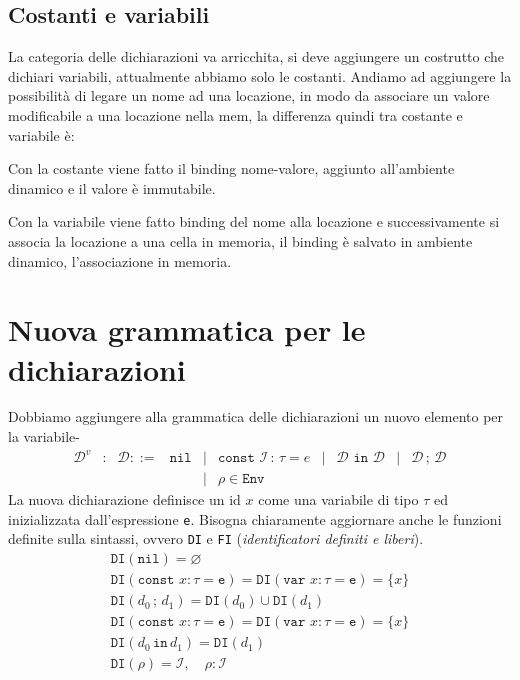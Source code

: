 \documentclass[oneside,a4paper,11pt]{book}
\theoremstyle{italicstyle}
\theoremstyle{normStyle}
\begin{document}
\subsection{Costanti e variabili}
La categoria delle dichiarazioni va arricchita, si deve aggiungere un
costrutto che dichiari variabili, attualmente abbiamo solo le costanti.
Andiamo ad aggiungere la possibilità di legare un nome ad una locazione,
in modo da associare un valore modificabile a una locazione nella mem, la
differenza quindi tra costante e variabile è:
\begin{tcolorbox}[title = {Costanti}]
  Con la costante viene fatto il binding nome-valore, aggiunto all’ambiente
  dinamico e il valore è immutabile.
\end{tcolorbox}
\begin{tcolorbox}[title = {Variabili}]
  Con la variabile viene fatto binding del nome alla locazione e
  successivamente si associa la locazione a una cella in memoria,
  il binding è salvato in ambiente dinamico, l’associazione in memoria.
\end{tcolorbox}
\section{Nuova grammatica per le dichiarazioni}
Dobbiamo aggiungere alla grammatica delle dichiarazioni un nuovo elemento per la variabile-
\[
  \begin{matrix}
    \mathcal{D}^v & : & \mathcal{D} ::=&\texttt{nil} & | & \texttt{const }\mathcal{I}\,:\,\tau = e&
    | & \mathcal{D} \texttt{ in } \mathcal{D} & | & \mathcal{D}\,;\,\mathcal{D}\\
    &&&& | & \rho \in \texttt{Env}
  \end{matrix}
\]
La nuova dichiarazione definisce un id $x$ come una variabile di tipo $\tau$ ed
inizializzata dall'espressione \verb|e|. Bisogna chiaramente aggiornare anche le
funzioni definite sulla sintassi, ovvero \verb|DI| e \verb|FI| (\textit{identificatori definiti
e liberi}).
\begin{align*}
  \texttt{DI}(\texttt{nil}) = \varnothing \\
  \texttt{DI}(\texttt{const }x:\tau = \texttt{e}) = \texttt{DI}(\texttt{var }x:\tau = \texttt{e}) = \{x\} \\
  \texttt{DI}(d_0\,;\,d_1) = \texttt{DI}(d_0)\cup \texttt{DI}(d_1) \\
  \texttt{DI}(\texttt{const }x:\tau = \texttt{e}) = \texttt{DI}(\texttt{var }x:\tau = \texttt{e}) = \{x\} \\
  \texttt{DI}(d_0\,\texttt{in}\,d_1) = \texttt{DI}(d_1)\\
  \texttt{DI}(\rho) = \mathcal{I},\quad\rho:\mathcal{I}
\end{align*}
\end{document}
